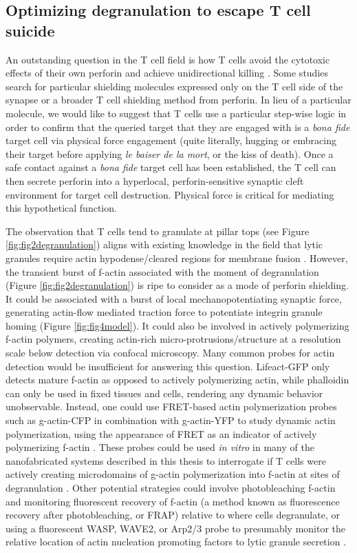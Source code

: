 \subsection{Optimizing degranulation to escape T cell suicide}
An outstanding question in the T cell field is how T cells avoid the cytotoxic effects of their own perforin and achieve unidirectional killing \cite{Lopez2013}. Some studies search for particular shielding molecules expressed only on the T cell side of the synapse \cite{Balaji2002} or a broader T cell shielding method \cite{Rudd-schmidt} from perforin. In lieu of a particular molecule, we would like to suggest that T cells use a particular step-wise logic in order to confirm that the queried target that they are engaged with is a \textit{bona fide} target cell via physical force engagement (quite literally, hugging or embracing their target before applying \textit{le baiser de la mort}, or the kiss of death). Once a safe contact against a \textit{bona fide} target cell has been established, the T cell can then secrete perforin into a hyperlocal, perforin-sensitive synaptic cleft environment for target cell destruction. Physical force is critical for mediating this hypothetical function. 

The observation that T cells tend to granulate at pillar tops (see Figure \ref{fig:fig2degranulation}) aligns with existing knowledge in the field that lytic granules require actin hypodense/cleared regions for membrane fusion \cite{Ritter2015}. However, the transient burst of f-actin associated with the moment of degranulation (Figure \ref{fig:fig2degranulation}) is ripe to consider as a mode of perforin shielding.  It could be associated with a burst of local mechanopotentiating synaptic force,  generating actin-flow mediated traction force to potentiate integrin granule homing (Figure \ref{fig:fig4model}). It could also be involved in actively polymerizing f-actin polymers, creating actin-rich micro-protrusions/structure at a resolution scale below detection via confocal microscopy. Many common probes for actin detection would be insufficient for answering this question. Lifeact-GFP only detects mature f-actin as opposed to actively polymerizing actin, while phalloidin can only be used in fixed tissues and cells, rendering any dynamic behavior unobservable. Instead, one could use FRET-based actin polymerization probes such as g-actin-CFP in combination with g-actin-YFP to study dynamic actin polymerization, using the appearance of FRET as an indicator of actively polymerizing f-actin \cite{LansingTaylor1981}. These probes could be used \textit{in vitro} in many of the nanofabricated systems described in this thesis to interrogate if T cells were actively creating microdomains of g-actin polymerization into f-actin at sites of degranulation \cite{Okamoto2004}. Other potential strategies could involve photobleaching f-actin and monitoring fluorescent recovery of f-actin (a method known as fluorescence recovery after photobleaching, or FRAP) \cite{Simon1988} relative to where cells degranulate, or using a fluorescent WASP, WAVE2, or Arp2/3 probe to presumably monitor the relative location of actin nucleation promoting factors to lytic granule secretion \cite{Obino2016, Tamzalit2018}. 

